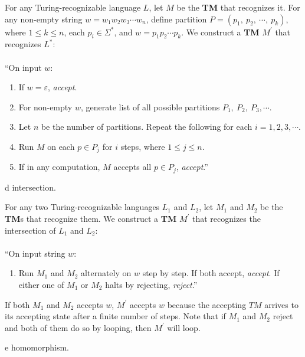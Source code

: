 \documentclass[11pt]{article}
\begin{document}
For any Turing-recognizable language $L$, let $M$ be the \textbf{TM} that recognizes it. For any non-empty string $w = w_1w_2w_3 \cdots w_n$, define partition $P = (p_1, \  p_2, \ \cdots , \ p_k)$, where $1 \leq k \leq n$, each $p_i \in \Sigma^{*}$, and $w = p_1  p_2 \cdots p_k$. We construct a \textbf{TM} $M^{'}$ that recognizes $L^{*}$: \\
\\
\textquotedblleft On input $w$:
\begin{enumerate}
\item If $w = \varepsilon$, \textit{accept}.
\item For non-empty $w$, generate list of all possible partitions $P_1, \ P_2, \ P_3, \cdots$.
\item Let $n$ be the number of partitions. Repeat the following for each $i = 1, 2, 3, \cdots$.
\item \hspace*{0.5cm} Run $M$ on each $p \in P_j$ for $i$ steps, where $1 \leq j \leq n$.
\item \hspace*{0.5cm} If in any computation, $M$ accepts all $p \in P_j$, \textit{accept}.\textquotedblright
\end{enumerate}

\begin{problem}[Part]{d}
intersection.
\end{problem}

For any two Turing-recognizable languages $L_1$ and $L_2$, let $M_1$ and $M_2$ be the \textbf{TM}s that recognize them. We construct a \textbf{TM} $M^{'}$ that recognizes the intersection of $L_1$ and $L_2$: \\
\\
\textquotedblleft On input string $w$:
\begin{enumerate}
\item Run $M_1$ and $M_2$ alternately on $w$ step by step. If both accept, \textit{accept}. If either one of $M_1$ or $M_2$ halts by rejecting, \textit{reject}.\textquotedblright
\end{enumerate}
If both $M_1$ and $M_2$ accepts $w$, $M^{'}$ accepts $w$ because the accepting $TM$ arrives to its accepting state after a finite number of steps. Note that if $M_1$ and $M_2$ reject and both of them do so by looping, then $M^{'}$ will loop.

\begin{problem}[Part]{e}
homomorphism.
\end{problem}
\end{document}
